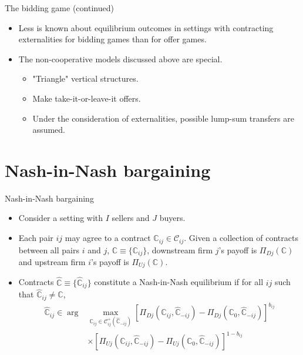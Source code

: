 \documentclass[aspectratio=169]{beamer}  %
\begin{document}
\begin{frame}{The bidding game (continued)}
    \begin{itemize}
        \item Less is known about equilibrium outcomes in settings with contracting externalities for bidding games than for offer games. \vspace{.2cm}
        \item The non-cooperative models discussed above are special. \vspace{.2cm}
        \begin{itemize}
            \item "Triangle" vertical structures. \vspace{.2cm}
            \item Make take-it-or-leave-it offers. \vspace{.2cm}
            \item Under the consideration of externalities, possible lump-sum transfers are assumed. \vspace{.2cm}
        \end{itemize}
    \end{itemize}
\end{frame}



\section{Nash-in-Nash bargaining}
\begin{frame}{Nash-in-Nash bargaining}
    \begin{itemize}
        \item Consider a setting with $I$ sellers and $J$ buyers. \vspace{.2cm}
        \item Each pair $ij$ may agree to a contract $\mathbb{C}_{ij}\in\mathcal{C}_{ij}$. Given a collection of contracts between all pairs $i$ and $j$, $\mathbb{C}\equiv\{\mathbb{C}_{ij}\}$, downstream firm $j$'s payoff is $\Pi_{Dj}(\mathbb{C})$ and upstream firm $i$'s payoff is $\Pi_{Uj}(\mathbb{C})$. \vspace{.2cm}
        \item Contracts $\hat{\mathbb{C}}\equiv \{\hat{\mathbb{C}}_{ij}\}$ constitute a Nash-in-Nash equilibrium if for all $ij$ such that $\hat{\mathbb{C}}_{ij}\neq \mathbb{C}$,  \vspace{.2cm}
        \begin{equation}
        \begin{aligned}
            \hat{\mathbb{C}}_{ij} \in \arg &\max_{\mathbb{C}_{ij} \in \mathcal{C}_{ij}^+ (\hat{\mathbb{C}}_{-ij})} [ \Pi_{Dj}(\mathbb{C}_{ij},\hat{\mathbb{C}}_{-ij}) - \Pi_{Dj}(\mathbb{C}_{0},\hat{\mathbb{C}}_{-ij})]^{b_{ij}}\\
            & \times [ \Pi_{Uj}(\mathbb{C}_{ij},\hat{\mathbb{C}}_{-ij}) - \Pi_{Uj}(\mathbb{C}_{0},\hat{\mathbb{C}}_{-ij})]^{1-b_{ij}}
        \end{aligned}
        \end{equation}
    \end{itemize}
\end{frame}
\end{document}
